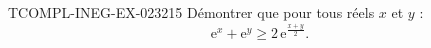 \begin{exercice}{TCOMPL-INEG-EX-023}{2}{15}
Démontrer que pour tous réels $x$ et $y$ :
\[ \mathrm{e}^x + \mathrm{e}^y \geq 2\,\mathrm{e}^{\frac{x+y}{2}}. \]

\end{exercice}
